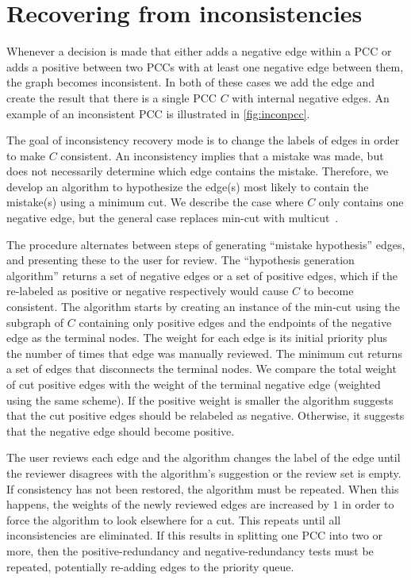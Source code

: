 \section{Recovering from inconsistencies}\label{sec:incon}
Whenever a decision is made that either adds a negative edge within a PCC or
  adds a positive between two PCCs with at least one negative edge between them,
  the graph becomes inconsistent.
In both of these cases we add the edge and create the result that there is a
  single PCC $C$ with internal negative edges.
An example of an inconsistent PCC is illustrated in \cref{fig:inconpcc}.

The goal of inconsistency recovery mode is to change the labels of edges in
  order to make $C$ consistent.
An inconsistency implies that a mistake was made, but does not necessarily
  determine which edge contains the mistake.
Therefore, we develop an algorithm to hypothesize the edge(s) most likely to
  contain the mistake(s) using a minimum cut.
We describe the case where $C$ only contains one negative edge, but the
  general case replaces min-cut with
  multicut~\cite{vazirani_approximation_2013}.

\inconpcc{}

The procedure alternates between steps of generating ``mistake hypothesis''
  edges, and presenting these to the user for review.
The ``hypothesis generation algorithm'' returns a set of negative edges or a
  set of positive edges, which if the re-labeled as positive or negative
  respectively would cause $C$ to become consistent.
The algorithm starts by creating an instance of the min-cut using the subgraph
  of $C$ containing only positive edges and the endpoints of the negative edge
  as the terminal nodes.
The weight for each edge is its initial priority plus the number of times that
  edge was manually reviewed.
The minimum cut returns a set of edges that disconnects the terminal nodes.
We compare the total weight of cut positive edges with the weight of the
  terminal negative edge (weighted using the same scheme).
If the positive weight is smaller the algorithm suggests that the cut positive
  edges should be relabeled as negative.
Otherwise, it suggests that the negative edge should become positive.

The user reviews each edge and the algorithm changes the label of the edge
  until the reviewer disagrees with the algorithm's suggestion or the review set
  is empty.
If consistency has not been restored, the algorithm must be repeated.
When this happens, the weights of the newly reviewed edges are increased by
  $1$ in order to force the algorithm to look elsewhere for a cut.
This repeats until all inconsistencies are eliminated.
If this results in splitting one PCC into two or more, then the
  positive-redundancy and negative-redundancy tests must be repeated,
  potentially re-adding edges to the priority queue.

